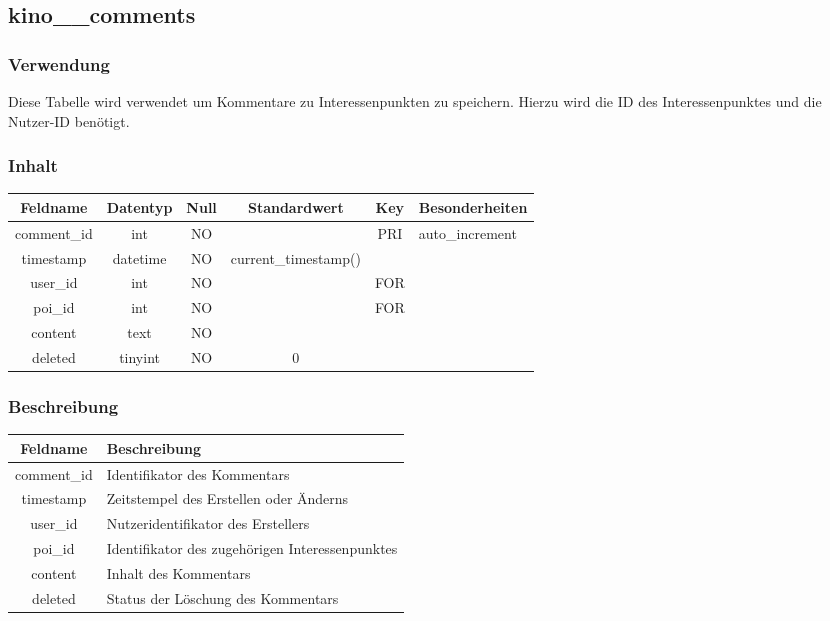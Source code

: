 \subsection{kino\_\_comments}
\subsubsection{Verwendung} Diese Tabelle wird verwendet um Kommentare zu Interessenpunkten zu speichern. Hierzu wird die ID des Interessenpunktes und die Nutzer-ID benötigt.
\subsubsection{Inhalt}
\begin{table}[H]
	\begin{tabular}{|c|c|c|c|c|p{3.5cm}|}
		\hline
		\textbf{Feldname} & \textbf{Datentyp} & \textbf{Null} & \textbf{Standardwert} & \textbf{Key}   & \textbf{Besonderheiten} \\ \hline
		comment\_id & int & NO &  & PRI & auto\_increment \\ \hline
		timestamp & datetime & NO & current\_timestamp() &  & \\ \hline
		user\_id & int & NO &  & FOR & \\ \hline
		poi\_id & int & NO &  & FOR & \\ \hline
		content & text & NO &  &  & \\ \hline
		deleted & tinyint & NO & 0 &  & \\ \hline
	\end{tabular}
\end{table}
\subsubsection{Beschreibung}
\begin{table}[H]
	\begin{tabular}{|c|p{12cm}|}
		\hline
		\textbf{Feldname} & \textbf{Beschreibung} \\ \hline
		comment\_id & Identifikator des Kommentars \\ \hline
		timestamp & Zeitstempel des Erstellen oder Änderns \\ \hline
		user\_id & Nutzeridentifikator des Erstellers \\ \hline
		poi\_id & Identifikator des zugehörigen Interessenpunktes \\ \hline
		content & Inhalt des Kommentars \\ \hline
		deleted & Status der Löschung des Kommentars \\ \hline
	\end{tabular}
\end{table}
